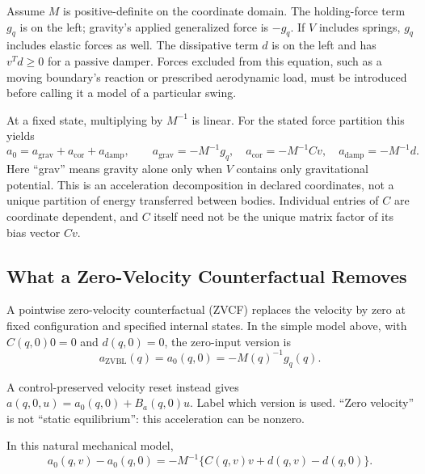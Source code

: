 Assume $M$ is positive-definite on the coordinate domain. The holding-force term $g_q$ is on the left; gravity's applied generalized force is $-g_q$. If $V$ includes springs, $g_q$ includes elastic forces as well. The dissipative term $d$ is on the left and has $v^Td\geq0$ for a passive damper. Forces excluded from this equation, such as a moving boundary's reaction or prescribed aerodynamic load, must be introduced before calling it a model of a particular swing.

At a fixed state, multiplying by $M^{-1}$ is linear. For the stated force partition this yields
\begin{equation}
a_0=a_{\mathrm{grav}}+a_{\mathrm{cor}}+a_{\mathrm{damp}},\qquad
a_{\mathrm{grav}}=-M^{-1}g_q,\quad
a_{\mathrm{cor}}=-M^{-1}Cv,\quad
a_{\mathrm{damp}}=-M^{-1}d.
\label{eq:ch7:drift-components}
\end{equation}
\label{eq:ch7:a-grav}
\label{eq:ch7:a-cor}
\label{tab:ch7:drift-decomposition}
\label{eq:ch7:drift-full}
\label{eq:ch7:drift-grav}
\label{eq:ch7:drift-cor}
Here ``grav'' means gravity alone only when $V$ contains only gravitational potential. This is an acceleration decomposition in declared coordinates, not a unique partition of energy transferred between bodies. Individual entries of $C$ are coordinate dependent, and $C$ itself need not be the unique matrix factor of its bias vector $Cv$.

\subsection{What a Zero-Velocity Counterfactual Removes}
\label{def:ch7:ZVCF}
A pointwise zero-velocity counterfactual (ZVCF) replaces the velocity by zero at fixed configuration and specified internal states. In the simple model above, with $C(q,0)0=0$ and $d(q,0)=0$, the zero-input version is
\begin{equation}
a_{\mathrm{ZVBL}}(q)=a_0(q,0)=-M(q)^{-1}g_q(q).
\label{eq:ch7:ZVCF}
\end{equation}

A control-preserved velocity reset instead gives $a(q,0,u)=a_0(q,0)+B_a(q,0)u$. Label which version is used. ``Zero velocity'' is not ``static equilibrium'': this acceleration can be nonzero.

In this natural mechanical model,
\begin{equation}
a_0(q,v)-a_0(q,0)=-M^{-1}\{C(q,v)v+d(q,v)-d(q,0)\}.
\label{eq:ch7:velocity-contribution}
\end{equation}

